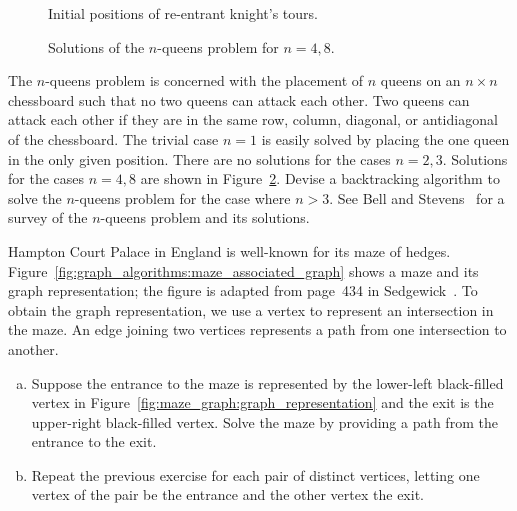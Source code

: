 \begin{problem}
\begin{figure}[!htbp]
\centering
{}

\caption{Initial positions of re-entrant knight's tours.}
\label{fig:graph_algorithms:reentrant_knight_tour}
\end{figure}

\begin{figure}[!htbp]
\centering

\caption{Solutions of the $n$-queens problem for $n = 4, 8$.}
\label{fig:graph_algorithms:n_queens_solutions}
\end{figure}

\item The $n$-queens problem is concerned with the placement of $n$
  queens on an $n \times n$ chessboard such that no two queens can
  attack each other. Two queens can attack each other if they are in
  the same row, column, diagonal, or antidiagonal of the chessboard.
  The trivial case $n = 1$ is easily solved by placing the one queen
  in the only given position. There are no solutions for the cases
  $n = 2, 3$. Solutions for the cases $n = 4, 8$ are shown in
  Figure~\ref{fig:graph_algorithms:n_queens_solutions}. Devise a
  backtracking algorithm to solve the $n$-queens problem for the case
  where $n > 3$. See Bell and Stevens~\cite{BellStevens2009} for a
  survey of the $n$-queens problem and its solutions.

\item Hampton Court Palace in England is well-known for its maze of
  hedges. Figure~\ref{fig:graph_algorithms:maze_associated_graph}
  shows a maze and its graph representation; the figure is adapted
  from page~434 in Sedgewick~\cite{Sedgewick1990}. To obtain the graph
  representation, we use a vertex to represent an intersection in the
  maze. An edge joining two vertices represents a path from one
  intersection to another.
  \begin{enumerate}[(a)]
  \item Suppose the entrance to the maze is represented by the
    lower-left black-filled vertex in
    Figure~\ref{fig:maze_graph:graph_representation} and the exit is
    the upper-right black-filled vertex. Solve the maze by providing a
    path from the entrance to the exit.

  \item Repeat the previous exercise for each pair of distinct
    vertices, letting one vertex of the pair be the entrance and the
    other vertex the exit.


\end{enumerate}
\end{problem}
